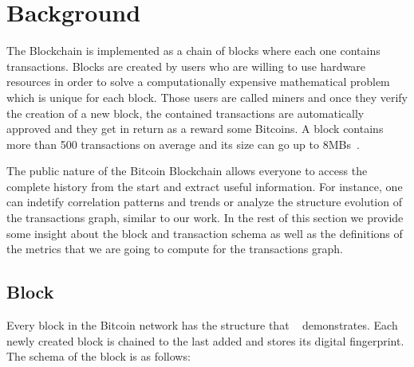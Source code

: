 \section{Background}
\label{sec:background}
The Blockchain is implemented as a chain of blocks where each one contains transactions. Blocks are created by users who are willing to use hardware resources in order to solve a computationally expensive mathematical problem which is unique for each block. Those users are called miners and once they verify the creation of a new block, the contained transactions are automatically approved and they get in return as a reward some Bitcoins. A block contains more than 500 transactions on average and its size can go up to 8MBs~\cite{damcosset}. 

The public nature of the Bitcoin Blockchain allows everyone to access the
complete history from the start and extract useful information. For instance,
one can indetify correlation patterns and trends or analyze the structure
evolution of the transactions graph, similar to our work. In the rest of this
section we provide some insight about the block and transaction schema as well as the
definitions of the metrics that we are going to compute for the transactions
graph.

\subsection{Block}
Every block in the Bitcoin network has the structure that ~ demonstrates. Each newly created block is chained to the last added and stores its digital fingerprint. The schema of the block is as follows:

